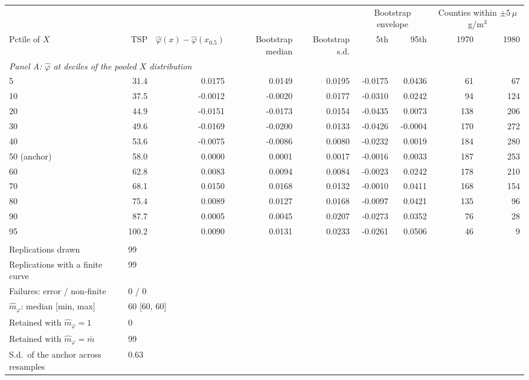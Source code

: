 \begin{tabular}{lrrrrrrrr}
\toprule
& & & & & \multicolumn{2}{c}{Bootstrap envelope} & \multicolumn{2}{c}{Counties within $\pm5\,\mu$g/m$^3$} \\
\cmidrule(lr){6-7} \cmidrule(lr){8-9}
Pctile of $X$ & TSP & $\hat\varphi(x)-\hat\varphi(x_{0.5})$ & Bootstrap median & Bootstrap s.d. & 5th & 95th & 1970 & 1980 \\
\midrule
\multicolumn{9}{l}{\textit{Panel A: $\hat\varphi$ at deciles of the pooled $X$ distribution}} \\
\midrule
5 & 31.4 & 0.0175 & 0.0149 & 0.0195 & -0.0175 & 0.0436 & 61 & 67 \\
10 & 37.5 & -0.0012 & -0.0020 & 0.0177 & -0.0310 & 0.0242 & 94 & 124 \\
20 & 44.9 & -0.0151 & -0.0173 & 0.0154 & -0.0435 & 0.0073 & 138 & 206 \\
30 & 49.6 & -0.0169 & -0.0200 & 0.0133 & -0.0426 & -0.0004 & 170 & 272 \\
40 & 53.6 & -0.0075 & -0.0086 & 0.0080 & -0.0232 & 0.0019 & 184 & 280 \\
50 (anchor) & 58.0 & 0.0000 & 0.0001 & 0.0017 & -0.0016 & 0.0033 & 187 & 253 \\
60 & 62.8 & 0.0083 & 0.0094 & 0.0084 & -0.0023 & 0.0242 & 178 & 210 \\
70 & 68.1 & 0.0150 & 0.0168 & 0.0132 & -0.0010 & 0.0411 & 168 & 154 \\
80 & 75.4 & 0.0089 & 0.0127 & 0.0168 & -0.0097 & 0.0421 & 135 & 96 \\
90 & 87.7 & 0.0005 & 0.0045 & 0.0207 & -0.0273 & 0.0352 & 76 & 28 \\
95 & 100.2 & 0.0090 & 0.0131 & 0.0233 & -0.0261 & 0.0506 & 46 & 9 \\
\addlinespace
\multicolumn{9}{l}{\textit{Panel B: bootstrap design and convergence}} \\
\midrule
Replications drawn & \multicolumn{8}{l}{99} \\
Replications with a finite curve & \multicolumn{8}{l}{99} \\
Failures: error / non-finite & \multicolumn{8}{l}{0 / 0} \\
$\hat m_\varphi$: median [min, max] & \multicolumn{8}{l}{60 [60, 60]} \\
Retained with $\hat m_\varphi = 1$ & \multicolumn{8}{l}{0} \\
Retained with $\hat m_\varphi = \bar m$ & \multicolumn{8}{l}{99} \\
S.d.\ of the anchor across resamples & \multicolumn{8}{l}{0.63} \\

\end{tabular}
